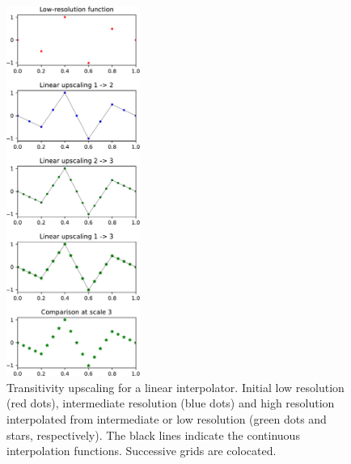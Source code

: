 \documentclass[12pt]{scrartcl}
\begin{document}
\begin{figure}[!h]
\begin{center}
\includegraphics[width=0.39\textwidth]{interpolation_comparison_lin_colocated.pdf}
\end{center}
\caption{\label{fig:lin_colocated} Transitivity upscaling for a linear interpolator. Initial low resolution (red dots), intermediate resolution (blue dots) and high resolution interpolated from intermediate or low resolution (green dots and stars, respectively). The black lines indicate the continuous interpolation functions. Successive grids are colocated.}
\end{figure}

\clearpage
\end{document}
